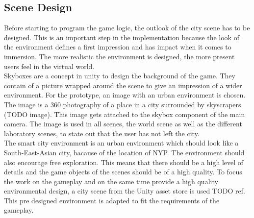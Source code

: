 \subsection{Scene Design}
Before starting to program the game logic, the outlook of the city scene has to be designed. This is an important step in the implementation because the look of the environment defines a first impression and has impact when it comes to immersion. The more realistic the environment is designed, the more present users feel in the virtual world.\\
Skyboxes are a concept in unity to design the background of the game. They contain of a picture wrapped around the scene to give an impression of a wider environment. 
For the prototype, an image with an urban environment is chosen. The image is a 360 photography of a place in a city surrounded by skyscrapers (TODO image). This image gets attached to the skybox component of the main camera. The image is used in all scenes, the world scene as well as the different laboratory scenes, to state out that the user has not left the city. \\
The smart city environment is an urban environment which should look like a South-East-Asian city, bacause of the location of NYP. The environment should also encourage free exploration. This means that there should be a high level of details and the game objects of the scenes should be of a high quality. To focus the work on the gameplay and on the same time provide a high quality environmental design, a city scene from the Unity asset store is used TODO ref. This pre designed environment is adapted to fit the requirements of the gameplay. 

